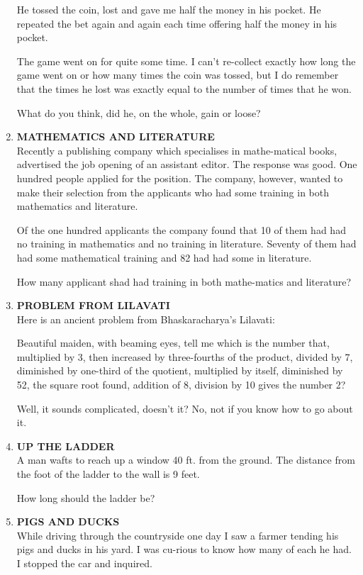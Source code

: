 \documentclass[12pt]{article}
\begin{document}
\begin{enumerate}
He tossed  the coin,  lost and gave  me half the money  in his pocket.  He  repeated  the bet again  and again  each  time offering  half  the money  in his pocket. 

The game  went  on for  quite  some  time.  I can't  re-collect  exactly  how  long  the game  went  on or how  many times  the coin  was  tossed,  but  I do remember  that  the times  he lost was exactly  equal  to the  number  of times that he won. 

What  do you  think,  did  he, on the  whole,  gain  or loose? 
%
\item \textbf{MATHEMATICS  AND  LITERATURE} \\
Recently  a publishing  company  which  specialises  in mathe-matical  books,  advertised  the job opening  of an assistant editor.  The  response  was  good.  One  hundred  people applied  for the position.  The  company,  however,  wanted to make  their  selection  from  the applicants  who  had  some training  in both  mathematics  and literature. 

Of the one hundred  applicants  the company  found  that 10 of them  had  had  no training  in mathematics  and no training  in literature.  Seventy  of them  had  had  some mathematical  training  and 82 had had some  in literature. 

How  many  applicant  shad  had training  in both  mathe-matics  and literature? 
%
\item \textbf{PROBLEM  FROM  LILAVATI} \\ 
Here  is an ancient  problem  from  Bhaskaracharya's Lilavati: 

Beautiful  maiden,  with  beaming  eyes,  tell me which  is the number  that,  multiplied  by 3, then  increased  by three-fourths  of the product,  divided  by 7, diminished  by one-third  of the  quotient,  multiplied  by itself,  diminished  by 52, the  square  root  found,  addition  of 8, division  by 10 gives  the number  2? 

Well,  it sounds  complicated,  doesn't  it? No,  not if you know  how  to go about  it. 
%
\item \textbf{UP THE  LADDER} \\ 
A man  wafts  to reach  up a window  40 ft. from  the ground. The distance  from  the foot  of the ladder  to the wall  is 9 feet. 

How  long  should  the ladder  be? 
%
\item \textbf{PIGS  AND  DUCKS} \\
While  driving  through  the  countryside  one  day I saw a farmer  tending  his pigs  and ducks  in his yard.  I was  cu-rious  to know  how  many  of each  he had.  I stopped  the car and inquired. 


\end{enumerate}
\end{document}
